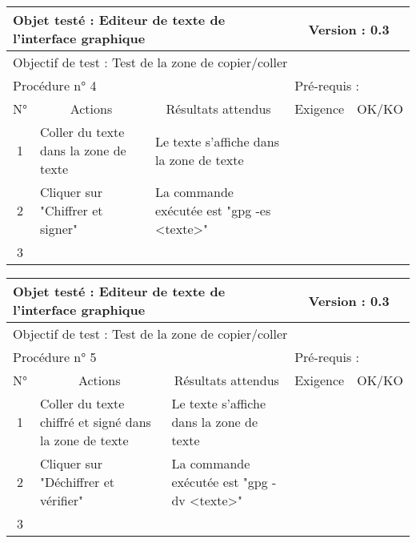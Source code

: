 \documentclass{../res/univ-projet}
\begin{document}
\begin{center}
    \begin{tabular}{|c|p{5cm}|p{5cm}|p{1.5cm}|p{1.5cm}|}
      \hline
      \multicolumn{3}{|l|}{Objet testé : Editeur de texte de l'interface graphique} & \multicolumn{2}{c|}{Version : 0.3}\\ \hline
      \multicolumn{5}{|l|}{Objectif de test : Test de la zone de copier/coller}\\ \hline
      \multicolumn{3}{|l|}{Procédure n° 4} & \multicolumn{2}{p{3cm}|}{Pré-requis : }\\ \hline
      \multicolumn{1}{|c|}{N°} & \multicolumn{1}{c|}{Actions} & \multicolumn{1}{c|}{Résultats attendus} & 
      \multicolumn{1}{c|}{Exigence} & \multicolumn{1}{c|}{OK/KO}\\ \hline
      1 & Coller du texte dans la zone de texte & Le texte s'affiche dans la zone de texte &  & \\
      2 & Cliquer sur "Chiffrer et signer" & La commande exécutée est "gpg -es <texte>" &  & \\
      3 &  &  &  & \\ \hline
    \end{tabular}
    \vskip 2.2cm



    \begin{tabular}{|c|p{5cm}|p{5cm}|p{1.5cm}|p{1.5cm}|}
      \hline
      \multicolumn{3}{|l|}{Objet testé : Editeur de texte de l'interface graphique} & \multicolumn{2}{c|}{Version : 0.3}\\ \hline
      \multicolumn{5}{|l|}{Objectif de test : Test de la zone de copier/coller}\\ \hline
      \multicolumn{3}{|l|}{Procédure n° 5} & \multicolumn{2}{p{3cm}|}{Pré-requis : }\\ \hline
      \multicolumn{1}{|c|}{N°} & \multicolumn{1}{c|}{Actions} & \multicolumn{1}{c|}{Résultats attendus} & 
      \multicolumn{1}{c|}{Exigence} & \multicolumn{1}{c|}{OK/KO}\\ \hline
      1 & Coller du texte chiffré et signé dans la zone de texte & Le texte s'affiche dans la zone de texte &  & \\
      2 & Cliquer sur "Déchiffrer et vérifier" & La commande exécutée est "gpg -dv <texte>" &  & \\
      3 &  &  &  & \\ \hline
    \end{tabular}
    \vskip 2.2cm




\end{center}
\end{document}
